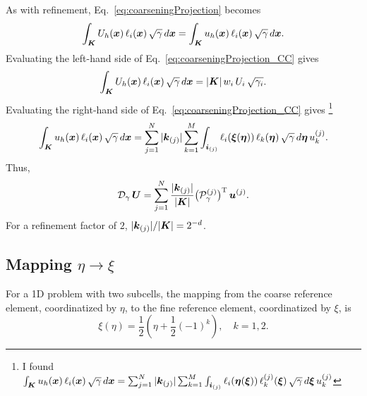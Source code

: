 \documentclass[10pt]{article}
\newcommand{\trans}{\textsc{T}}
\begin{document}
As with refinement, Eq.~\eqref{eq:coarseningProjection} becomes
\begin{equation}
  \int_{\boldsymbol{K}}U_{h}(\boldsymbol{x})\,\ell_{i}(\boldsymbol{x})\,\sqrt{\gamma}\,d\boldsymbol{x}
  =\int_{\boldsymbol{K}}u_{h}(\boldsymbol{x})\,\ell_{i}(\boldsymbol{x})\,\sqrt{\gamma}\,d\boldsymbol{x}.
  \label{eq:coarseningProjection_CC}
\end{equation}
Evaluating the left-hand side of Eq.~\eqref{eq:coarseningProjection_CC} gives
\begin{equation}
  \int_{\boldsymbol{K}}U_{h}(\boldsymbol{x})\,\ell_{i}(\boldsymbol{x})\,\sqrt{\gamma}\,d\boldsymbol{x}
  =|\boldsymbol{K}|\,w_{i}\,U_{i}\,\sqrt{\gamma_{i}}.
\end{equation}
Evaluating the right-hand side of Eq.~\eqref{eq:coarseningProjection_CC} gives
\footnote{I found $\int_{\boldsymbol{K}}u_{h}(\boldsymbol{x})\,\ell_{i}(\boldsymbol{x})\,\sqrt{\gamma}\,d\boldsymbol{x}
  =\sum_{j=1}^{N}|\boldsymbol{k}_{(j)}|\sum_{k=1}^{M}\int_{\boldsymbol{i}_{(j)}}\ell_{i}(\boldsymbol{\eta}(\boldsymbol{\xi}))\,\ell_{k}^{\left(j\right)}(\boldsymbol{\xi})\,\sqrt{\gamma}\,d\boldsymbol{\xi}\,u_{k}^{(j)}$}
\begin{equation}
  \int_{\boldsymbol{K}}u_{h}(\boldsymbol{x})\,\ell_{i}(\boldsymbol{x})\,\sqrt{\gamma}\,d\boldsymbol{x}
  =\sum_{j=1}^{N}|\boldsymbol{k}_{(j)}|\sum_{k=1}^{M}\int_{\boldsymbol{i}_{(j)}}\ell_{i}(\boldsymbol{\xi}(\boldsymbol{\eta}))\,\ell_{k}(\boldsymbol{\eta})\,\sqrt{\gamma}\,d\boldsymbol{\eta}\,u_{k}^{(j)}.
\end{equation}
Thus,
\begin{equation}
  \mathcal{D}_{\gamma}\,\vect{U}=\sum_{j=1}^{N}\f{|\vect{k}_{(j)}|}{|\vect{K}|}
  \big(\mathcal{P}_{\gamma}^{(j)}\big)^{\trans}\,\vect{u}^{(j)}.
\end{equation}
For a refinement factor of $2$, $|\boldsymbol{k}_{(j)}|/|\boldsymbol{K}|=2^{-d}$.

\subsection{Mapping $\eta\rightarrow\xi$}
For a 1D problem with two subcells, the mapping from the coarse reference element, coordinatized
by $\eta$, to the fine reference element, coordinatized by $\xi$, is
\begin{equation}
\xi\left(\eta\right)=\frac{1}{2}\left(\eta+\frac{1}{2}\left(-1\right)^{k}\right),\hspace{1em}k=1,2.
\end{equation}



\end{document}
